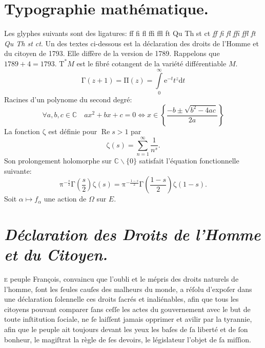 \documentclass[10pt]{article}
\begin{document}
\section*{Typographie mathématique.}
Les glyphes suivants sont des ligatures: ff fi fl ffi ffl ft Qu Th st ct \emph{ff fi fl ffi ffl ft Qu Th st ct}. Un des textes ci-dessous est la déclaration des droits de l'Homme et du citoyen de 1793. Elle diffère de la version de 1789.
Rappelons que $1789+4=1793$. $\mathrm{T}^*M$ est le fibré cotangent de la variété différentiable $M$.
\begin{equation}
\mathrm{\Gamma}(z+1)=\mathrm{\Pi}(z)=\int\limits_0^\infty \mathrm{e}^{-t}t^z \mathrm{d} t
\end{equation}
Racines d'un polynome du second degré:
\begin{equation}
\forall a, b, c \in\mathbb{C}\quad a x^2 + b x + c = 0 \Leftrightarrow x \in \left\lbrace\frac{-b \pm \sqrt{b^2 - 4 a c}}{2a}\right\rbrace
\end{equation}
La fonction $\mathrm{\zeta}$ est définie pour $\operatorname{Re} s > 1$ par
\begin{equation}
\mathrm{\zeta}(s)=\sum\limits_{n=1}^\infty \frac{1}{n^s}\textbf{.}
\end{equation}
Son prolongement holomorphe sur $\mathbb{C}\smallsetminus\{0\}$ satisfait l'équation fonctionnelle suivante:
\begin{equation}
\mathrm{\pi}^{-\frac{s}{2}}\mathrm{\Gamma}\left(\frac{s}{2}\right)\mathrm{\zeta}(s)
=\mathrm{\pi}^{-\frac{1-s}{2}}\mathrm{\Gamma}\left(\frac{1-s}{2}\right)\mathrm{\zeta}(1-s)\text{.}
\end{equation}
Soit $\alpha\mapsto f_\alpha$ une action de $\Omega$ sur $E$.
\pagebreak

\section*{\textit{Déclaration des Droits de l'Homme et du Citoyen.}}
\lettrine[lines=3]{}{e} peuple François, convaincu que l'oubli et le mépris des droits naturels de l'hom\-me, ſont les ſeules cauſes des malheurs du monde, a réſolu d'expoſer dans une déclaration ſolennelle ces droits ſacrés et inaliénables, afin que tous les citoyens pouvant comparer ſans ceſſe les actes du gouvernement avec le but de toute inſtitution ſociale, ne ſe laiſſent jamais opprimer et avilir par la tyrannie, afin que le peuple ait toujours devant les yeux les baſes de ſa liberté et de ſon bonheur, le magiſtrat la règle de ſes devoirs, le législateur l'objet de ſa miſſion.
\end{document}

